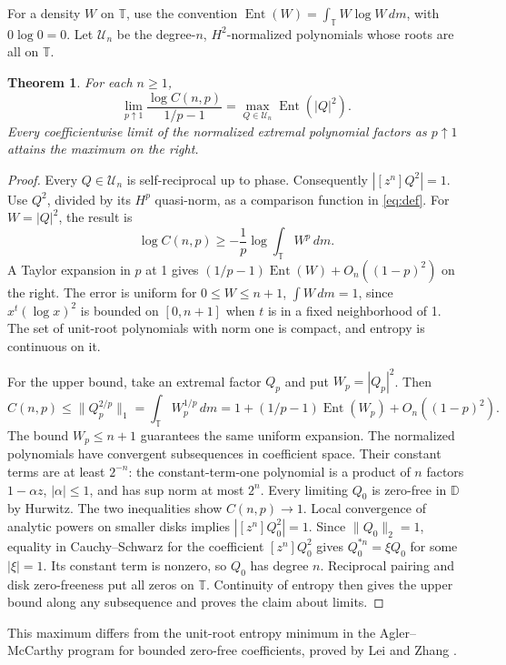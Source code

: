 \documentclass[11pt]{article}
\newtheorem{theorem}{Theorem}
\newcommand{\D}{\mathbb D}
\newcommand{\T}{\mathbb T}
\newcommand{\Ent}{\operatorname{Ent}}
\newcommand{\coef}[1]{[z^{#1}]}
\begin{document}
For a density \(W\) on \(\T\), use the convention
\(\Ent(W)=\int_{\T}W\log W\,dm\), with \(0\log0=0\).
Let \(\mathcal U_n\) be the degree-\(n\), \(H^2\)-normalized
polynomials whose roots are all on \(\T\).

\begin{theorem}\label{thm:entropy}
For each \(n\ge1\),
\[
 \lim_{p\uparrow1}\frac{\log C(n,p)}{1/p-1}
      =\max_{Q\in\mathcal U_n}\Ent(|Q|^2).
\]
Every coefficientwise limit of the normalized extremal polynomial
factors as \(p\uparrow1\) attains the maximum on the right.
\end{theorem}

\begin{proof}
Every \(Q\in\mathcal U_n\) is self-reciprocal up to phase.
Consequently \(|\coef n Q^2|=1\). Use \(Q^2\), divided by
its \(H^p\) quasi-norm, as a comparison function in \eqref{eq:def}.
For \(W=|Q|^2\), the result is
\[
 \log C(n,p)\ge -\frac1p\log\int_{\T} W^p\,dm.
\]
A Taylor expansion in \(p\) at 1 gives
\((1/p-1)\Ent(W)+O_n((1-p)^2)\) on the right. The error
is uniform for \(0\le W\le n+1\), \(\int W\,dm=1\), since
\(x^t(\log x)^2\) is bounded on \([0,n+1]\) when \(t\) is
in a fixed neighborhood of 1. The set of unit-root polynomials
with norm one is compact, and entropy is continuous on it.

For the upper bound, take an extremal factor \(Q_p\) and put
\(W_p=|Q_p|^2\). Then
\[
 C(n,p)\le \|Q_p^{2/p}\|_1
       =\int_{\T} W_p^{1/p}\,dm
       =1+(1/p-1)\Ent(W_p)+O_n((1-p)^2).
\]
The bound \(W_p\le n+1\) guarantees the same uniform expansion.
The normalized polynomials have convergent subsequences in
coefficient space. Their constant terms are at least \(2^{-n}\):
the constant-term-one polynomial is a product of \(n\) factors
\(1-\alpha z\), \(|\alpha|\le1\), and has sup norm at most \(2^n\).
Every limiting \(Q_0\) is zero-free in \(\D\) by Hurwitz.
The two inequalities show \(C(n,p)\to1\).
Local convergence of analytic powers on smaller disks implies
\(|\coef n Q_0^2|=1\). Since \(\|Q_0\|_2=1\), equality in
Cauchy--Schwarz for the coefficient \([z^n]Q_0^2\) gives
\(Q_0^{*n}=\xi Q_0\) for some \(|\xi|=1\).
Its constant term is nonzero, so \(Q_0\) has degree \(n\).
Reciprocal pairing and disk zero-freeness put all zeros on \(\T\).
Continuity of entropy then gives the upper bound along any
subsequence and proves the claim about limits.
\end{proof}

This maximum differs from the unit-root entropy minimum in the
Agler--McCarthy program for bounded zero-free coefficients,
proved by Lei and Zhang \cite{LeiZhang}.
\end{document}

